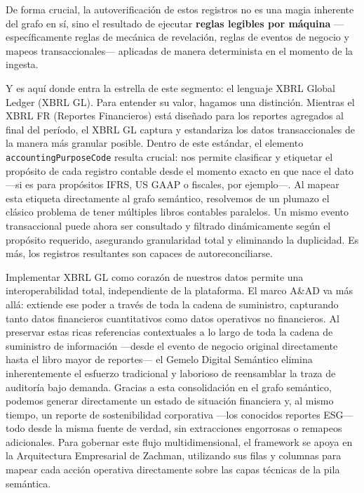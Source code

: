 \documentclass[12pt, a4paper]{article}
\begin{document}
De forma crucial, la autoverificación de estos registros no es una magia inherente del grafo en sí, sino el resultado de ejecutar \textbf{reglas legibles por máquina} ---específicamente reglas de mecánica de revelación, reglas de eventos de negocio y mapeos transaccionales--- aplicadas de manera determinista en el momento de la ingesta.

Y es aquí donde entra la estrella de este segmento: el lenguaje XBRL Global Ledger (XBRL GL). Para entender su valor, hagamos una distinción. Mientras el XBRL FR (Reportes Financieros) está diseñado para los reportes agregados al final del período, el XBRL GL captura y estandariza los datos transaccionales de la manera más granular posible. Dentro de este estándar, el elemento \texttt{accountingPurposeCode} resulta crucial: nos permite clasificar y etiquetar el propósito de cada registro contable desde el momento exacto en que nace el dato ---si es para propósitos IFRS, US GAAP o fiscales, por ejemplo---. Al mapear esta etiqueta directamente al grafo semántico, resolvemos de un plumazo el clásico problema de tener múltiples libros contables paralelos. Un mismo evento transaccional puede ahora ser consultado y filtrado dinámicamente según el propósito requerido, asegurando granularidad total y eliminando la duplicidad. Es más, los registros resultantes son capaces de autoreconciliarse.

Implementar XBRL GL como corazón de nuestros datos permite una interoperabilidad total, independiente de la plataforma. El marco A\&AD va más allá: extiende ese poder a través de toda la cadena de suministro, capturando tanto datos financieros cuantitativos como datos operativos no financieros. Al preservar estas ricas referencias contextuales a lo largo de toda la cadena de suministro de información ---desde el evento de negocio original directamente hasta el libro mayor de reportes--- el Gemelo Digital Semántico elimina inherentemente el esfuerzo tradicional y laborioso de reensamblar la traza de auditoría bajo demanda. Gracias a esta consolidación en el grafo semántico, podemos generar directamente un estado de situación financiera y, al mismo tiempo, un reporte de sostenibilidad corporativa ---los conocidos reportes ESG--- todo desde la misma fuente de verdad, sin extracciones engorrosas o remapeos adicionales. Para gobernar este flujo multidimensional, el framework se apoya en la Arquitectura Empresarial de Zachman, utilizando sus filas y columnas para mapear cada acción operativa directamente sobre las capas técnicas de la pila semántica.
\end{document}
